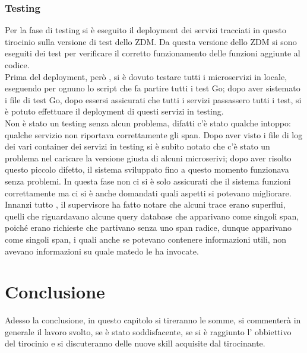 \documentclass[a4paper,12pt,titlepage,italian,openany]{report}
\begin{document}
\subsection{Testing}
Per la fase di testing si è eseguito il deployment dei servizi tracciati in questo tirocinio sulla versione di test dello ZDM\cite{zdm:1}.
 Da questa versione dello ZDM\cite{zdm:1} si sono eseguiti dei test per verificare il corretto funzionamento delle funzioni aggiunte al codice.\\
Prima del deployment, però , si è dovuto testare tutti i microservizi in locale, eseguendo per ognuno lo script che fa partire tutti i test Go;
 dopo aver sistemato i file di test Go, dopo essersi assicurati che tutti i servizi passassero tutti i test, si è potuto effettuare il deployment di questi servizi in testing.\\ 
Non è stato un testing senza alcun problema, difatti c'è stato qualche intoppo: qualche servizio non riportava correttamente gli span. 
Dopo aver visto i file di log dei vari container dei servizi in testing si è subito notato che c'è stato un problema nel caricare la versione giusta di alcuni microserivi; dopo aver risolto questo piccolo difetto, il sistema sviluppato fino a questo momento funzionava senza problemi.
In questa fase non ci si è solo assicurati che il sistema funzioni correttamente ma ci si è anche domandati quali aspetti si potevano migliorare. Innanzi tutto , il supervisore ha fatto notare che alcuni trace erano superflui, quelli che riguardavano alcune query database che apparivano come singoli span, poiché erano richieste che partivano senza uno span radice, dunque apparivano come singoli span, i quali anche 
se potevano contenere informazioni utili, non avevano informazioni su quale matedo le ha invocate.
\cite{opentracing:1}
\chapter{Conclusione}
Adesso la conclusione, in questo capitolo si tireranno le somme, si commenterà in generale il lavoro svolto, se è stato soddisfacente, se si è raggiunto l' obbiettivo del tirocinio e si discuteranno delle nuove skill acquisite dal tirocinante.
\end{document}
